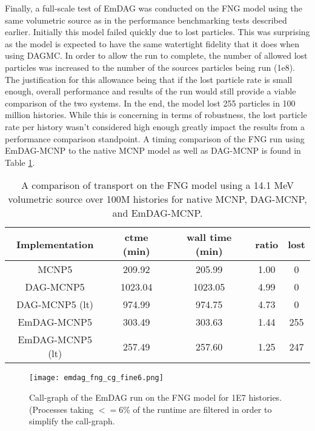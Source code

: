 Finally, a full-scale test of EmDAG was conducted on the FNG model using the
same volumetric source as in the performance benchmarking tests described
earlier. Initially this model failed quickly due to lost particles. This was
surprising as the model is expected to have the same watertight fidelity that it
does when using DAGMC. In order to allow the run to complete, the number of
allowed lost particles was increased to the number of the sources particles
being run (1e8). The justification for this allowance being that if the lost
particle rate is small enough, overall performance and results of the run would
still provide a viable comparison of the two systems. In the end, the model lost
255 particles in 100 million histories. While this is concerning in terms of
robustness, the lost particle rate per history wasn't considered high enough
greatly impact the results from a performance comparison standpoint. A timing
comparison of the FNG run using EmDAG-MCNP to the native MCNP model as well as
DAG-MCNP is found in Table \ref{fngemdag}.

\begin{table}[H]
  \small
  \begin{center}
        \begin{tabular}{|c|c|c|c|c|}
      \hline
      \textbf{Implementation} & \textbf{ctme (min)} & \textbf{wall time (min)} & \textbf{ratio} & \textbf{lost} \\
      \hline
      MCNP5 & 209.92 & 205.99 &  1.00 & 0 \\
      \hline
      DAG-MCNP5 & 1023.04 & 1023.05 & 4.99 & 0  \\
      \hline
      DAG-MCNP5 (lt) & 974.99 & 974.75 & 4.73 & 0  \\
      \hline      
      EmDAG-MCNP5 & 303.49 & 303.63 & 1.44 & 255  \\
      \hline
      EmDAG-MCNP5 (lt) & 257.49 & 257.60  & 1.25 & 247 \\
      \hline
    \end{tabular} 
    \caption{A comparison of transport on the FNG model using a 14.1 MeV
      volumetric source over 100M histories for native MCNP, DAG-MCNP, and
      EmDAG-MCNP.}
    \label{fngemdag}
  \end{center}
\end{table}


\begin{figure}
  \centering
  \texttt{[image: emdag\_fng\_cg\_fine6.png]}
  \caption{Call-graph of the EmDAG run on the FNG model for 1E7
    histories. (Processes taking $<=$6\% of the runtime are filtered in order to
    simplify the call-graph.}
  \label{emdag-fng-coarse}  
\end{figure}

